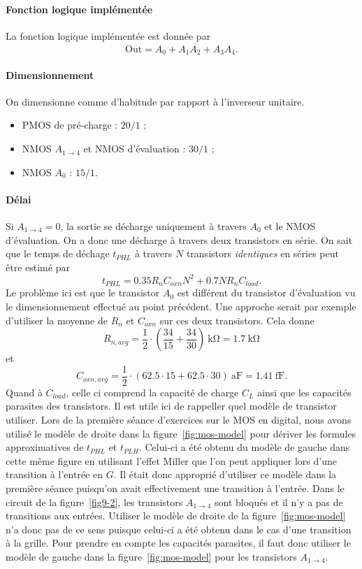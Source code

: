 \documentclass[frenchb,DIV=14]{scrartcl}
\begin{document}
\paragraph{Fonction logique implémentée}
La fonction logique implémentée est donnée par
\[ \text{Out} = \overline{A_0 + A_1A_2 + A_3A_4}.\]

\paragraph{Dimensionnement}
On dimensionne comme d'habitude par rapport à l'inverseur unitaire.
\begin{itemize}
	\item PMOS de pré-charge : $20/1$ ;
	\item NMOS $A_{1\to4}$ et NMOS d'évaluation : $30/1$ ;
	\item NMOS $A_0$ : $15/1$. 
\end{itemize}

\paragraph{Délai}
Si $A_{1\to4} = 0$, la sortie se décharge uniquement à travers $A_0$
et le NMOS d'évaluation. On a donc une décharge à travers deux transistors
en série. On sait que le temps de déchage $t_{PHL}$ à travers $N$
transistors \emph{identiques} en séries peut être estimé par
\[ t_{PHL} = 0.35R_nC_{oxn}N^2 + 0.7NR_nC_{load}. \]
Le problème ici est que le transistor $A_0$ est différent du transistor
d'évaluation vu le dimensionnement effectué au point précédent.
Une approche serait par exemple d'utiliser la moyenne de $R_n$ et $C_{oxn}$
sur ces deux transistors. Cela donne
\[ R_{n,avg} = \frac{1}{2} \cdot \left(\frac{34}{15} + \frac{34}{30}\right)\SI{}{\kilo\ohm}
= \SI{1.7}{\kilo\ohm} \]
et
\[ C_{oxn,avg} = \frac{1}{2} \cdot \left(62.5\cdot 15 + 62.5\cdot 30\right)\SI{}{\atto\farad}
= \SI{1.41}{\femto\farad}. \]
Quand à $C_{load}$, celle ci comprend la capacité de charge $C_L$ ainsi que
les capacités parasites des transistors. Il est utile ici de rappeller
quel modèle de transistor utiliser. Lors de la première séance d'exercices sur
le MOS en digital, nous avons utilisé le modèle de droite dans la figure~\ref{fig:mos-model}
pour dériver les formules approximatives de $t_{PHL}$ et $t_{PLH}$.
Celui-ci a été obtenu du modèle de gauche dans cette même figure en utilisant
l'effet Miller que l'on peut appliquer lors d'une transition à l'entrée en $G$.
Il était donc approprié d'utiliser ce modèle dans la première séance puisqu'on
avait effectivement une transition à l'entrée.
Dans le circuit de la figure~\ref{fig9-2}, les transistors $A_{1\to 4}$ sont
bloqués et il n'y a pas de transitions aux entrées. Utiliser le modèle de droite
de la figure~\ref{fig:mos-model} n'a donc pas de ce sens puisque celui-ci a été
obtenu dans le cas d'une transition à la grille. Pour prendre en compte les capacités
parasites, il faut donc utiliser le modèle de gauche dans la figure~\ref{fig:mos-model}
pour les transistors $A_{1\to 4}$.\\
\end{document}
